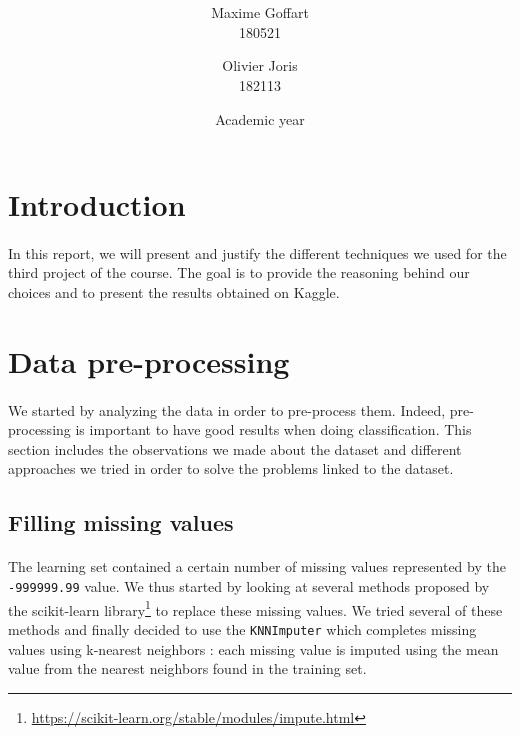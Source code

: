 \documentclass[a4paper, 11pt, oneside]{article}
\title{\ClassName\\\vspace*{0.8cm}\ProjectName\vspace{1cm}}
\author{Maxime Goffart \\180521 \and Olivier Joris\\182113}
\date{\vspace{1cm}Academic year \AcademicYear}
\begin{document}
\begin{titlingpage}
{\let\newpage\relax\maketitle}
\end{titlingpage}

\thispagestyle{empty}
\newpage


\tableofcontents
\newpage


\section{Introduction}
\paragraph{}In this report, we will present and justify the different techniques we used for the third project of the course. The goal is to provide the reasoning behind our choices and to present the results obtained on Kaggle.

\section{Data pre-processing}
\paragraph{}We started by analyzing the data in order to pre-process them. Indeed, pre-processing is important
to have good results when doing classification. This section includes the observations we made about the dataset
and different approaches we tried in order to solve the problems linked to the dataset.

\subsection{Filling missing values}
\paragraph{}The learning set contained a certain number of missing values represented by the \texttt{-999999.99} value. We thus started by looking at several 
methods proposed by the scikit-learn library\footnote{\url{https://scikit-learn.org/stable/modules/impute.html}} to replace these missing values. We tried several of these methods and finally decided to use the \texttt{KNNImputer} which completes missing values using k-nearest neighbors : each missing value is imputed using the mean value from the nearest neighbors found in the training set. 
\end{document}

